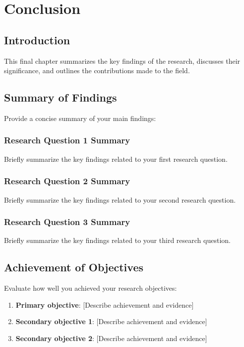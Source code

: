 \chapter{Conclusion}

\section{Introduction}

This final chapter summarizes the key findings of the research, discusses their significance, and outlines the contributions made to the field.

\section{Summary of Findings}

Provide a concise summary of your main findings:

\subsection{Research Question 1 Summary}
Briefly summarize the key findings related to your first research question.

\subsection{Research Question 2 Summary}
Briefly summarize the key findings related to your second research question.

\subsection{Research Question 3 Summary}
Briefly summarize the key findings related to your third research question.

\section{Achievement of Objectives}

Evaluate how well you achieved your research objectives:

\begin{enumerate}
    \item \textbf{Primary objective}: [Describe achievement and evidence]
    \item \textbf{Secondary objective 1}: [Describe achievement and evidence]
    \item \textbf{Secondary objective 2}: [Describe achievement and evidence]
\end{enumerate}

